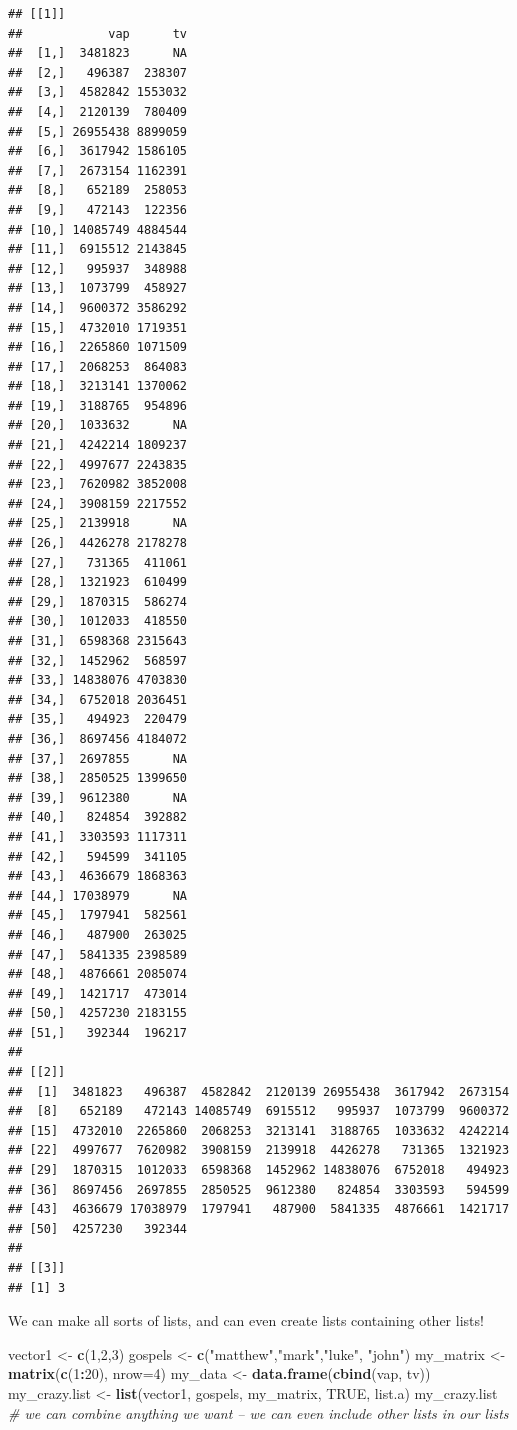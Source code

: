 \documentclass[]{article}
\newenvironment{Shaded}{\begin{snugshade}}{\end{snugshade}}
\newcommand{\KeywordTok}[1]{\textcolor[rgb]{0.13,0.29,0.53}{\textbf{#1}}}
\newcommand{\DataTypeTok}[1]{\textcolor[rgb]{0.13,0.29,0.53}{#1}}
\newcommand{\DecValTok}[1]{\textcolor[rgb]{0.00,0.00,0.81}{#1}}
\newcommand{\StringTok}[1]{\textcolor[rgb]{0.31,0.60,0.02}{#1}}
\newcommand{\CommentTok}[1]{\textcolor[rgb]{0.56,0.35,0.01}{\textit{#1}}}
\newcommand{\OtherTok}[1]{\textcolor[rgb]{0.56,0.35,0.01}{#1}}
\newcommand{\OperatorTok}[1]{\textcolor[rgb]{0.81,0.36,0.00}{\textbf{#1}}}
\newcommand{\NormalTok}[1]{#1}
\begin{document}
\begin{verbatim}
## [[1]]
##            vap      tv
##  [1,]  3481823      NA
##  [2,]   496387  238307
##  [3,]  4582842 1553032
##  [4,]  2120139  780409
##  [5,] 26955438 8899059
##  [6,]  3617942 1586105
##  [7,]  2673154 1162391
##  [8,]   652189  258053
##  [9,]   472143  122356
## [10,] 14085749 4884544
## [11,]  6915512 2143845
## [12,]   995937  348988
## [13,]  1073799  458927
## [14,]  9600372 3586292
## [15,]  4732010 1719351
## [16,]  2265860 1071509
## [17,]  2068253  864083
## [18,]  3213141 1370062
## [19,]  3188765  954896
## [20,]  1033632      NA
## [21,]  4242214 1809237
## [22,]  4997677 2243835
## [23,]  7620982 3852008
## [24,]  3908159 2217552
## [25,]  2139918      NA
## [26,]  4426278 2178278
## [27,]   731365  411061
## [28,]  1321923  610499
## [29,]  1870315  586274
## [30,]  1012033  418550
## [31,]  6598368 2315643
## [32,]  1452962  568597
## [33,] 14838076 4703830
## [34,]  6752018 2036451
## [35,]   494923  220479
## [36,]  8697456 4184072
## [37,]  2697855      NA
## [38,]  2850525 1399650
## [39,]  9612380      NA
## [40,]   824854  392882
## [41,]  3303593 1117311
## [42,]   594599  341105
## [43,]  4636679 1868363
## [44,] 17038979      NA
## [45,]  1797941  582561
## [46,]   487900  263025
## [47,]  5841335 2398589
## [48,]  4876661 2085074
## [49,]  1421717  473014
## [50,]  4257230 2183155
## [51,]   392344  196217
## 
## [[2]]
##  [1]  3481823   496387  4582842  2120139 26955438  3617942  2673154
##  [8]   652189   472143 14085749  6915512   995937  1073799  9600372
## [15]  4732010  2265860  2068253  3213141  3188765  1033632  4242214
## [22]  4997677  7620982  3908159  2139918  4426278   731365  1321923
## [29]  1870315  1012033  6598368  1452962 14838076  6752018   494923
## [36]  8697456  2697855  2850525  9612380   824854  3303593   594599
## [43]  4636679 17038979  1797941   487900  5841335  4876661  1421717
## [50]  4257230   392344
## 
## [[3]]
## [1] 3
\end{verbatim}

We can make all sorts of lists, and can even create lists containing
other lists!

\begin{Shaded}
\begin{Highlighting}[]
\NormalTok{vector1 <-}\StringTok{ }\KeywordTok{c}\NormalTok{(}\DecValTok{1}\NormalTok{,}\DecValTok{2}\NormalTok{,}\DecValTok{3}\NormalTok{)}
\NormalTok{gospels <-}\StringTok{ }\KeywordTok{c}\NormalTok{(}\StringTok{"matthew"}\NormalTok{,}\StringTok{"mark"}\NormalTok{,}\StringTok{"luke"}\NormalTok{, }\StringTok{"john"}\NormalTok{)}
\NormalTok{my_matrix <-}\StringTok{ }\KeywordTok{matrix}\NormalTok{(}\KeywordTok{c}\NormalTok{(}\DecValTok{1}\OperatorTok{:}\DecValTok{20}\NormalTok{), }\DataTypeTok{nrow=}\DecValTok{4}\NormalTok{)}
\NormalTok{my_data <-}\StringTok{ }\KeywordTok{data.frame}\NormalTok{(}\KeywordTok{cbind}\NormalTok{(vap, tv))}
\NormalTok{my_crazy.list <-}\StringTok{ }\KeywordTok{list}\NormalTok{(vector1, gospels, my_matrix, }\OtherTok{TRUE}\NormalTok{, list.a)}
\NormalTok{my_crazy.list }\CommentTok{# we can combine anything we want -- we can even include other lists in our lists}
\end{Highlighting}
\end{Shaded}
\end{document}
